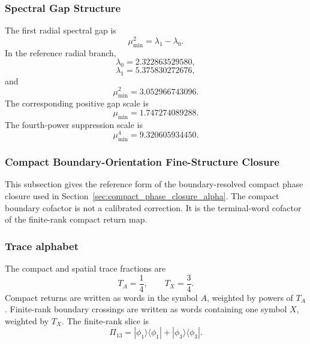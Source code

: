 \documentclass[11pt]{article}
\begin{document}
\subsubsection{Spectral Gap Structure}
\label{app:spectral-gap}

The first radial spectral gap is
\begin{equation}
\boxed{
\mu_{\min}^2
=
\lambda_1-\lambda_0.
}
\end{equation}
In the reference radial branch,
\begin{equation}
\boxed{
\lambda_0
=
2.322863529580,
}
\end{equation}
\begin{equation}
\boxed{
\lambda_1
=
5.375830272676,
}
\end{equation}
and
\begin{equation}
\boxed{
\mu_{\min}^2
=
3.052966743096.
}
\end{equation}
The corresponding positive gap scale is
\begin{equation}
\boxed{
\mu_{\min}
=
1.747274089288.
}
\end{equation}
The fourth-power suppression scale is
\begin{equation}
\boxed{
\mu_{\min}^4
=
9.320605934450.
}
\end{equation}

\subsubsection{Compact Boundary-Orientation Fine-Structure Closure}
\label{app:compact-boundary-closure}

This subsection gives the reference form of the boundary-resolved compact phase closure used in Section~\ref{sec:compact_phase_closure_alpha}. The compact boundary cofactor is not a calibrated correction. It is the terminal-word cofactor of the finite-rank compact return map.

\subsubsection{Trace alphabet}
\label{app:trace-alphabet}

The compact and spatial trace fractions are
\begin{equation}
\boxed{
T_A=\frac14,
\qquad
T_X=\frac34.
}
\end{equation}
Compact returns are written as words in the symbol \(A\), weighted by powers of \(T_A\). Finite-rank boundary crossings are written as words containing one symbol \(X\), weighted by \(T_X\). The finite-rank slice is
\begin{equation}
\boxed{
\Pi_{13}
=
|\phi_1\rangle\langle\phi_1|
+
|\phi_3\rangle\langle\phi_3|.
}
\end{equation}
\end{document}
